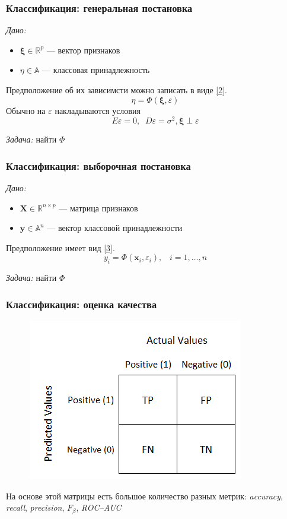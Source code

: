 \documentclass[11pt]{beamer}
\begin{document}
	\begin{frame}
		\frametitle{Классификация: генеральная постановка}
		\textit{Дано:}
		\begin{itemize}
			\item $\bm{\xi} \in \mathbb{R}^p$ --- вектор признаков
			\item $\eta \in \mathbb{A}$ --- классовая принадлежность
		\end{itemize}
	
		Предположение об их зависимсти можно записать в виде \ref{2}.
		\begin{equation}
			\eta = \Phi(\bm{\xi}, \varepsilon)
			\label{2}
		\end{equation}
		Обычно на $\varepsilon$ накладываются условия $$E\varepsilon = 0, \;\; D\varepsilon = \sigma^2, \bm{\xi} \perp \varepsilon$$
		
		\textit{Задача:} найти $\Phi$
	\end{frame}
	\begin{frame}
		\frametitle{Классификация: выборочная постановка}
		\textit{Дано:}
		\begin{itemize}
			\item $\bm{X} \in \mathbb{R}^{n\times p}$ --- матрица признаков
			\item $\bm{y} \in \mathbb{A}^n$ --- вектор классовой принадлежности
		\end{itemize}
		
		Предположение имеет вид \ref{3}.
		\begin{equation}
			y_i = \Phi(\bm{x}_i, \varepsilon_i),\;\;\; i = 1, \ldots, n
			\label{3}
		\end{equation}
		
		\textit{Задача:} найти $\Phi$
	\end{frame}
	\begin{frame}
		\frametitle{Классификация: оценка качества}
		\begin{figure}
			\includegraphics[width=0.3\linewidth]{imgs/conf_matrix}
		\end{figure}
	    На основе этой матрицы есть большое количество разных метрик: \textit{accuracy}, \textit{recall}, \textit{precision}, $F_\beta$, \textit{ROC--AUC}
	\end{frame}
\end{document}
